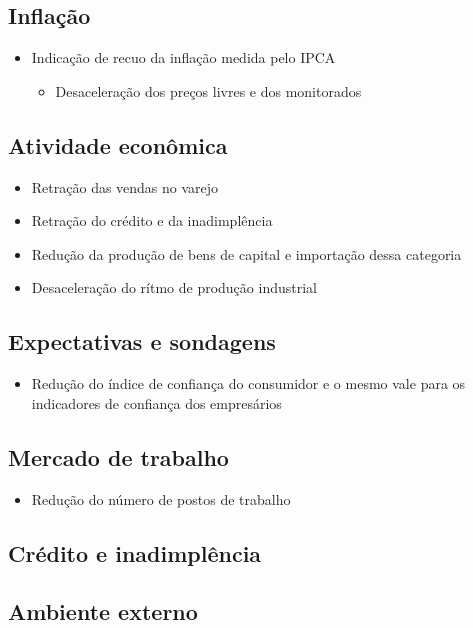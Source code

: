 \documentclass[11pt]{article}
\begin{document}
\subsection*{Inflação}
\label{sec:org5cd89b4}
\begin{itemize}
\item Indicação de recuo da inflação medida pelo IPCA
\begin{itemize}
\item Desaceleração dos preços livres e dos monitorados
\end{itemize}
\end{itemize}
\subsection*{Atividade econômica}
\label{sec:orgd659de0}
\begin{itemize}
\item Retração das vendas no varejo
\item Retração do crédito e da inadimplência
\item Redução da produção de bens de capital e importação dessa categoria
\item Desaceleração do rítmo de produção industrial
\end{itemize}
\subsection*{Expectativas e sondagens}
\label{sec:org2c3737a}
\begin{itemize}
\item Redução do índice de confiança do consumidor e o mesmo vale para os indicadores de confiança dos empresários
\end{itemize}
\subsection*{Mercado de trabalho}
\label{sec:org23972bc}
\begin{itemize}
\item Redução do número de postos de trabalho
\end{itemize}
\subsection*{Crédito e inadimplência}
\label{sec:org07e469c}
\subsection*{Ambiente externo}
\label{sec:orga8efded}
\end{document}
